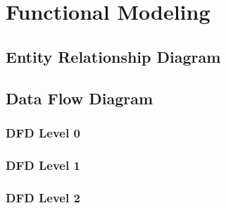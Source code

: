 \section{Functional Modeling}
\subsection{Entity Relationship Diagram}
\subsection{Data Flow Diagram}
\subsubsection{DFD Level 0}
\subsubsection{DFD Level 1}
\subsubsection{DFD Level 2}